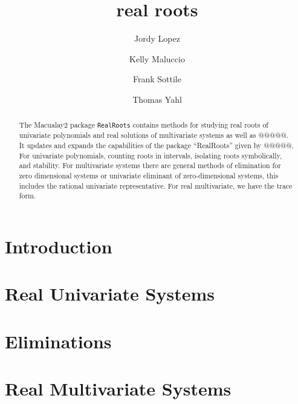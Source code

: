 \documentclass[12pt]{amsart}
\title{real roots}
\author[J.~Lopez]{Jordy Lopez}
\author[K.~Maluccio]{Kelly Maluccio}
\author[F.~Sottile]{Frank Sottile}
\author[T.~Yahl]{Thomas Yahl}
\theoremstyle{definition}
\begin{document}









%
%




\begin{abstract}
The Macualay2 package \texttt{RealRoots} contains methods for studying real roots of univariate polynomials and real solutions of multivariate systems as well as @@@@@. It updates and expands the capabilities of the package ``RealRoots'' given by @@@@@. For univariate polynomials, counting roots in intervals, isolating roots symbolically, and stability. For multivariate systems there are general methods of elimination for zero dimensional systems or univariate eliminant of zero-dimensional systems, this includes the rational univariate representative. For real multivariate, we have the trace form. 
\end{abstract}

\maketitle


\section*{Introduction}


\section{Real Univariate Systems}
%
%

\section{Eliminations}
%


\section{Real Multivariate Systems}
%



%

\end{document}
